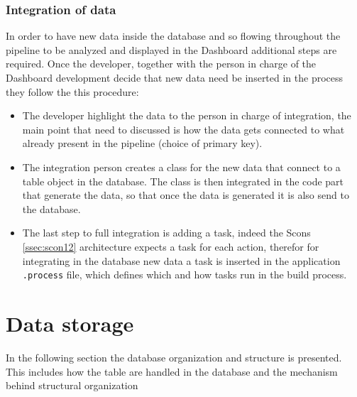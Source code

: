\documentclass[../main.tex]{subfiles}
\begin{document}
\subsubsection{Integration of data}
In order to have new data inside the database and so flowing throughout the pipeline to be analyzed and displayed in the Dashboard additional steps are required. Once the developer, together with the person in charge of the Dashboard development decide that new data need be inserted in the process they follow the this procedure:
\begin{itemize}
    \item The developer highlight the data to the person in charge of integration, the main point that need to discussed is how the data gets connected to what already present in the pipeline (choice of primary key).
    \item The integration person creates a class for the new data that connect to a table object in the database. The class is then integrated in the code part that generate the data, so that once the data is generated it is also send to the database.
    \item The last step to full integration is adding a task, indeed the Scons \ref{ssec:scon12} architecture expects a task for each action, therefor for integrating in the database new data a task is inserted in the application \texttt{.process} file, which defines which and how tasks run in the build process. 
\end{itemize}
\section{Data storage}
In the following section the database organization and structure is presented. This includes how the table are handled in the database and the mechanism behind structural organization
\end{document}
